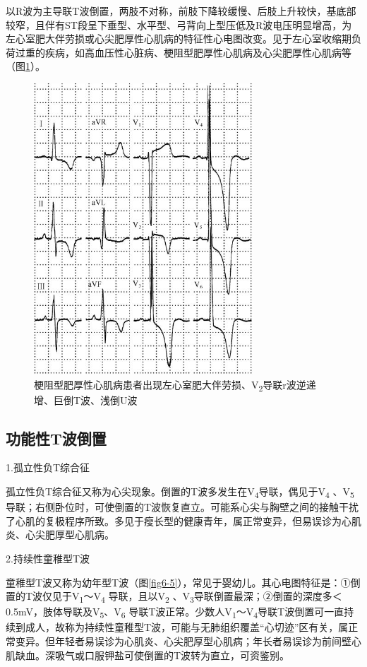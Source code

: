 以R波为主导联T波倒置，两肢不对称，前肢下降较缓慢、后肢上升较快，基底部较窄，且伴有ST段呈下垂型、水平型、弓背向上型压低及R波电压明显增高，为左心室肥大伴劳损或心尖肥厚性心肌病的特征性心电图改变。见于左心室收缩期负荷过重的疾病，如高血压性心脏病、梗阻型肥厚性心肌病及心尖肥厚性心肌病等（图\ref{fig6-4}）。

\begin{figure}[!htbp]
 \centering
 \includegraphics[width=3.22917in,height=4.29167in]{./images/Image00096.jpg}
 \captionsetup{justification=centering}
 \caption{梗阻型肥厚性心肌病患者出现左心室肥大伴劳损、V\textsubscript{2}导联r波逆递增、巨倒T波、浅倒U波}
 \label{fig6-4}
  \end{figure} 


\protect\hypertarget{text00012.htmlux5cux23subid92}{}{}

\subsection{功能性T波倒置}

1.孤立性负T综合征

孤立性负T综合征又称为心尖现象。倒置的T波多发生在V\textsubscript{4}导联，偶见于V\textsubscript{4} 、V\textsubscript{5}导联；右侧卧位时，可使倒置的T波恢复直立。可能系心尖与胸壁之间的接触干扰了心肌的复极程序所致。多见于瘦长型的健康青年，属正常变异，但易误诊为心肌炎、心尖肥厚型心肌病。

2.持续性童稚型T波

童稚型T波又称为幼年型T波（图\ref{fig6-5}），常见于婴幼儿。其心电图特征是：①倒置的T波仅见于V\textsubscript{1}～V\textsubscript{4} 导联，且以V\textsubscript{2} 、V\textsubscript{3}导联倒置最深；②倒置的深度多＜0.5mV，肢体导联及V\textsubscript{5}、V\textsubscript{6} 导联T波正常。少数人V\textsubscript{1}～V\textsubscript{4}导联T波倒置可一直持续到成人，故称为持续性童稚型T波，可能与无肺组织覆盖“心切迹”区有关，属正常变异。但年轻者易误诊为心肌炎、心尖肥厚型心肌病；年长者易误诊为前间壁心肌缺血。深吸气或口服钾盐可使倒置的T波转为直立，可资鉴别。

